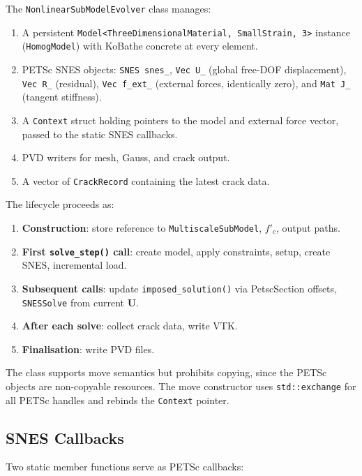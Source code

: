 The \texttt{NonlinearSubModelEvolver} class manages:
\begin{enumerate}
  \item A persistent \texttt{Model<ThreeDimensionalMaterial,
        SmallStrain, 3>} instance (\texttt{HomogModel}) with
        KoBathe concrete at every element.
  \item PETSc SNES objects: \texttt{SNES snes\_}, \texttt{Vec U\_}
        (global free-DOF displacement), \texttt{Vec R\_} (residual),
        \texttt{Vec f\_ext\_} (external forces, identically zero),
        and \texttt{Mat J\_} (tangent stiffness).
  \item A \texttt{Context} struct holding pointers to the model and
        external force vector, passed to the static SNES callbacks.
  \item PVD writers for mesh, Gauss, and crack output.
  \item A vector of \texttt{CrackRecord} containing the latest crack
        data.
\end{enumerate}

The lifecycle proceeds as:
\begin{enumerate}
  \item \textbf{Construction}: store reference to
        \texttt{MultiscaleSubModel}, $f'_c$, output paths.
  \item \textbf{First \texttt{solve\_step()} call}: create model,
        apply constraints, setup, create SNES, incremental load.
  \item \textbf{Subsequent calls}: update
        \texttt{imposed\_solution()} via PetscSection offsets,
        \texttt{SNESSolve} from current $\mathbf{U}$.
  \item \textbf{After each solve}: collect crack data, write VTK.
  \item \textbf{Finalisation}: write PVD files.
\end{enumerate}

The class supports move semantics but prohibits copying, since the
PETSc objects are non-copyable resources.  The move constructor uses
\texttt{std::exchange} for all PETSc handles and rebinds the
\texttt{Context} pointer.


\subsection{SNES Callbacks}
\label{ssec:nlevo-snes-callbacks}

Two static member functions serve as PETSc callbacks:

